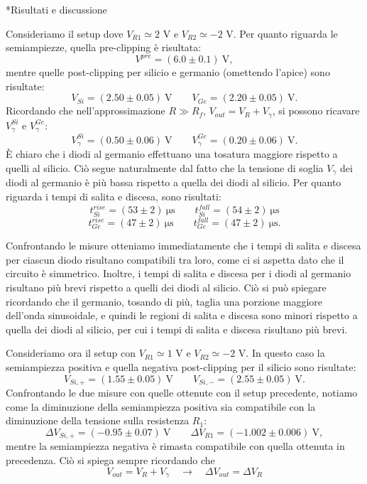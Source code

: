 \documentclass[12pt,italian]{article}
\makeatletter
\numberwithin{table}{section}
\let\oldsection\section
\renewcommand{\section}{\@ifstar{\@mystarsection}{\@mynormsection}}
\newcommand{\@mystarsection}[1]{%
    \oldsection*{#1}%
    \phantomsection%
    \addcontentsline{toc}{section}{#1}%
}
\newcommand{\@mynormsection}[2][]{%
    \if\relax\detokenize{#1}\relax
        \oldsection{#2}%
    \else
        \oldsection[#1]{#2}%
    \fi
}
\makeatother
\begin{document}
\section*{Risultati e discussione}

Consideriamo il setup dove $V_{R1} \simeq 2$ \unit{\volt} e $V_{R2} \simeq -2$
\unit{\volt}. Per quanto riguarda le semiampiezze, quella pre-clipping è
risultata:
\[
	V^{pre} = (6.0 \pm 0.1) \ \unit{\volt},
\]
mentre quelle post-clipping per silicio e germanio (omettendo l'apice) sono
risultate:
\[
	V_{Si} = (2.50 \pm 0.05) \ \unit{\volt} \qquad
	V_{Ge} = (2.20 \pm 0.05) \ \unit{\volt}.
\]
Ricordando che nell'approssimazione $R \gg R_f$, $V_{out} = V_R + V_{\gamma}$,
si possono ricavare $V_\gamma^{Si}$ e $V_\gamma^{Ge}$:
\[
	V_\gamma^{Si} = (0.50 \pm 0.06) \ \unit{\volt} \qquad
	V_\gamma^{Ge} = (0.20 \pm 0.06) \ \unit{\volt}.
\]
\`E chiaro che i diodi al germanio effettuano una tosatura maggiore rispetto
a quelli al silicio. Ciò segue naturalmente dal fatto che la tensione di soglia
$V_{\gamma}$ dei diodi al germanio è più bassa rispetto a quella dei diodi al
silicio.
Per quanto riguarda i tempi di salita e discesa, sono risultati:
\[
	t^{rise}_{Si} = (53 \pm 2) \ \unit{\micro\second} \qquad
	t^{fall}_{Si} = (54 \pm 2) \ \unit{\micro\second}
\]
\[
	t^{rise}_{Ge} = (47 \pm 2) \ \unit{\micro\second} \qquad
	t^{fall}_{Ge} = (47 \pm 2) \ \unit{\micro\second}.
\]

Confrontando le misure otteniamo immediatamente che i tempi di salita e discesa
per ciascun diodo risultano compatibili tra loro, come ci si aspetta dato che
il circuito è simmetrico. Inoltre, i tempi di salita e discesa per i diodi al
germanio risultano più brevi rispetto a quelli dei diodi al silicio. Ciò si può
spiegare ricordando che il germanio, tosando di più, taglia una porzione
maggiore dell'onda sinusoidale, e quindi le regioni di salita e discesa sono
minori rispetto a quella dei diodi al silicio, per cui i tempi di salita e
discesa risultano più brevi.

Consideriamo ora il setup con $V_{R1} \simeq 1$ \unit{\volt} e $V_{R2} \simeq
	-2$ \unit{\volt}. In questo caso la semiampiezza positiva e quella negativa
post-clipping per il silicio sono risultate:
\[
	V_{Si, +} = (1.55 \pm 0.05) \ \unit{\volt} \qquad
	V_{Si, -} = (2.55 \pm 0.05) \ \unit{\volt}.
\]
Confrontando le due misure con quelle ottenute con il setup precedente, notiamo
come la diminuzione della semiampiezza positiva sia compatibile con la
diminuzione della tensione sulla resistenza $R_1$:
\[
	\Delta V_{Si, +} = (-0.95 \pm 0.07) \ \unit{\volt} \qquad
	\Delta V_{R1} = (-1.002 \pm 0.006) \ \unit{\volt},
\]
mentre la semiampiezza negativa è rimasta compatibile con quella ottenuta in
precedenza. Ciò si spiega sempre ricordando che
\begin{equation*}
	V_{out} = V_R + V_{\gamma} \quad \rightarrow  \quad \Delta V_{out} = \Delta V_R
\end{equation*}
\end{document}
